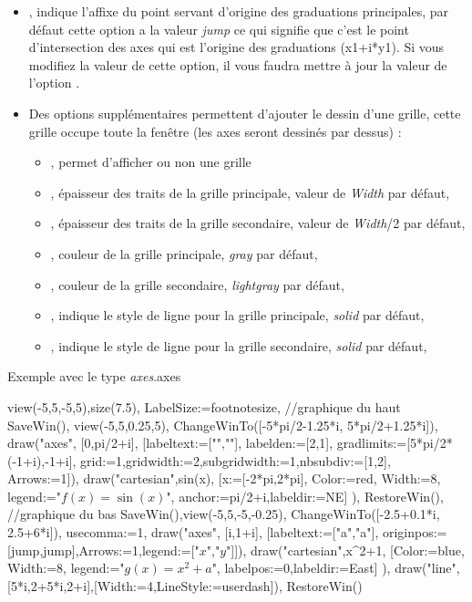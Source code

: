 \begin{itemize}
\begin{itemize}
  \item {}
  \item {}
  \item {}
  \item {}
  \end{itemize}
 \item {}, indique l'affixe du point servant d'origine des graduations principales, par défaut cette option a la valeur \emph{jump} ce qui signifie que c'est le point d'intersection des axes qui est l'origine des graduations (x1+i*y1). Si vous modifiez la valeur de cette option, il vous faudra mettre à jour la valeur de l'option .  
 \item Des options supplémentaires permettent d'ajouter le dessin d'une grille, cette grille occupe toute la fenêtre (les axes seront dessinés par dessus) :
  \begin{itemize}
  \item {}, permet d'afficher ou non une grille
  \item {}, épaisseur des traits de la grille principale, valeur de \emph{Width} par défaut,
  \item {}, épaisseur des traits de la grille secondaire, valeur de \emph{Width}/2 par défaut,
  \item {}, couleur de la grille principale, \emph{gray} par défaut,
  \item {}, couleur de la grille secondaire, \emph{lightgray} par défaut,
  \item {}, indique le style de ligne pour la grille principale, \emph{solid} par défaut,
  \item {}, indique le style de ligne pour la grille secondaire, \emph{solid} par défaut,
  \end{itemize}
\end{itemize}


\begin{demo}{Exemple avec le type \emph{axes}.}{axes}
\begin{texgraph}[name=axes]
view(-5,5,-5,5),size(7.5),
LabelSize:=footnotesize,
//graphique du haut
SaveWin(), view(-5,5,0.25,5),
ChangeWinTo([-5*pi/2-1.25*i, 5*pi/2+1.25*i]),
draw("axes", [0,pi/2+i], [labeltext:=["\pi",""],
 labelden:=[2,1], gradlimits:=[5*pi/2*(-1+i),-1+i],
 grid:=1,gridwidth:=2,subgridwidth:=1,nbsubdiv:=[1,2],
 Arrows:=1]),
draw("cartesian",sin(x), [x:=[-2*pi,2*pi],
 Color:=red, Width:=8, legend:="$f(x)=\sin(x)$",
 anchor:=pi/2+i,labeldir:=NE] ),
RestoreWin(),
//graphique du bas
SaveWin(),view(-5,5,-5,-0.25),
ChangeWinTo([-2.5+0.1*i, 2.5+6*i]), usecomma:=1,
draw("axes", [i,1+i], [labeltext:=["\sqrt a","a"],
 originpos:=[jump,jump],Arrows:=1,legend:=["$x$","$y$"]]),
draw("cartesian",x^2+1, [Color:=blue, Width:=8,
 legend:="$g(x)=x^2+a$", labelpos:=0,labeldir:=East] ),
draw("line", [5*i,2+5*i,2+i],[Width:=4,LineStyle:=userdash]),
RestoreWin()
\end{texgraph}
\end{demo}

